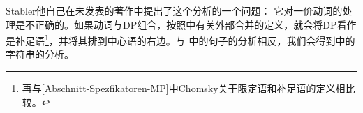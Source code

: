 Stabler他自己在未发表的著作\citep[]{Veenstra98a}中提出了这\label{Seite-leeres-Objekt}个分析的一个问题：
它对一价动词的处理是不正确的。如果动词与DP组合，按照中有关外部合并的定义，就会将DP看作是补足语\footnote{%
再与\ref{Abschnitt-Spezfikatoren-MP}中Chomsky关于限定语和补足语的定义相比较。
}，并将其排到中心语的右边。与 中的句子的分析相反，我们会得到中的字符串的分析。


